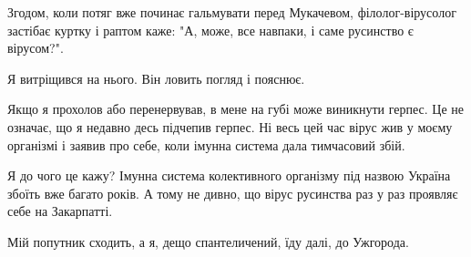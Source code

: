 Згодом, коли потяг вже починає гальмувати перед Мукачевом, філолог-вірусолог
застібає куртку і раптом каже: "А, може, все навпаки, і саме русинство є
вірусом?".

Я витріщився на нього. Він ловить погляд і пояснює.

\textemdash Якщо я прохолов або перенервував, в мене на губі може виникнути герпес. Це не
означає, що я недавно десь підчепив герпес. Ні \textemdash весь цей час вірус жив у моєму
організмі і заявив про себе, коли імунна система дала тимчасовий збій.

Я до чого це кажу? Імунна система колективного організму під назвою Україна
збоїть вже багато років. А тому не дивно, що вірус русинства раз у раз проявляє
себе на Закарпатті.

Мій попутник сходить, а я, дещо спантеличений, їду далі, до Ужгорода.

